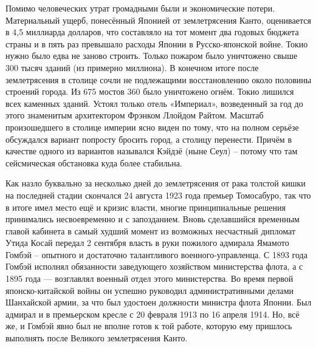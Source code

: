Помимо человеческих утрат громадными были и экономические потери. Материальный ущерб, понесённый Японией от землетрясения Канто, оценивается в 4,5 миллиарда долларов, что составляло на тот момент два годовых бюджета страны и в пять раз превышало расходы Японии в Русско-японской войне. Токио нужно было едва не заново строить. Только пожаром было уничтожено свыше 300 тысяч зданий (из примерно миллиона). В конечном итоге после землетрясения в столице сочли не подлежащими восстановлению около половины строений города. Из 675 мостов 360 было уничтожено огнём. Токио лишился всех каменных зданий. Устоял только отель «Империал», возведенный за год до этого знаменитым архитектором Фрэнком Ллойдом Райтом. Масштаб произошедшего в столице империи ясно виден по тому, что на полном серьёзе обсуждался вариант попросту бросить город, а столицу перенести. Причём в качестве одного из вариантов назывался Кэйдзё (ныне Сеул) – потому что там сейсмическая обстановка куда более стабильна.

Как назло буквально за несколько дней до землетрясения от рака толстой кишки на последней стадии скончался 24 августа 1923 года премьер Томосабуро, так что в итоге имел место ещё и кризис власти, многие принципиальные решения принимались несвоевременно и с запозданием. Вновь сделавшийся временным главой кабинета в самый худший момент из возможных несчастный дипломат Утида Косай передал 2 сентября власть в руки пожилого адмирала Ямамото Гомбэй – опытного и достаточно талантливого военного-управленца. С 1893 года Гомбэй исполнял обязанности заведующего хозяйством министерства флота, а с 1895 года — возглавлял военный отдел этого министерства. Во время первой японско-китайской войны он успешно руководил административными делами Шанхайской армии, за что был удостоен должности министра флота Японии. Был адмирал и в премьерском кресле с 20 февраля 1913 по 16 апреля 1914. Но, всё же, и Гомбэй явно был не вполне готов к той работе, которую ему пришлось выполнять после Великого землетрясения Канто.

